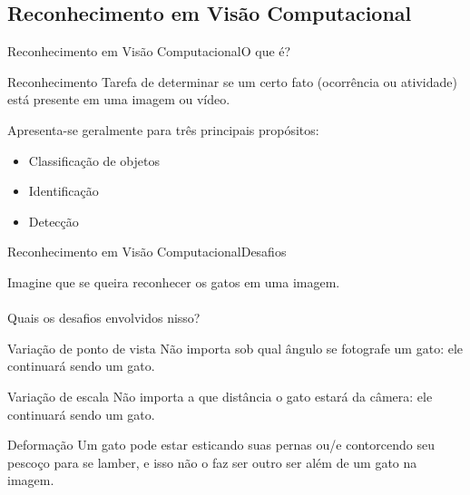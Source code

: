 \documentclass{beamer}
\begin{document}
\subsection{Reconhecimento em Visão Computacional}
    \begin{frame}{Reconhecimento em Visão Computacional}{O que é?}

        \begin{block}{Reconhecimento}
            Tarefa de determinar se um certo fato (ocorrência ou atividade) está presente em uma imagem ou vídeo. 
        \end{block}

        \pause

        Apresenta-se geralmente para três principais propósitos:

        \begin{itemize}
            \item<3-> Classificação de objetos
            \item<4-> Identificação
            \item<5-> Detecção
        \end{itemize}

    \end{frame}

    \begin{frame}{Reconhecimento em Visão Computacional}{Desafios}
        
        Imagine que se queira reconhecer os gatos em uma imagem.
        \\~\\
        Quais os desafios envolvidos nisso?

        \pause
    
        \begin{alertblock}{Variação de ponto de vista}
            Não importa sob qual ângulo se fotografe um gato:
            ele continuará sendo um gato.
        \end{alertblock}

        \begin{alertblock}{Variação de escala}
            Não importa a que distância o gato estará da câmera:
            ele continuará sendo um gato.
        \end{alertblock}

        \begin{alertblock}{Deformação}
            Um gato pode estar esticando suas pernas ou/e contorcendo
            seu pescoço para se lamber, e isso não o faz ser
            outro ser além de um gato na imagem.
        \end{alertblock}

    \end{frame}
\end{document}
